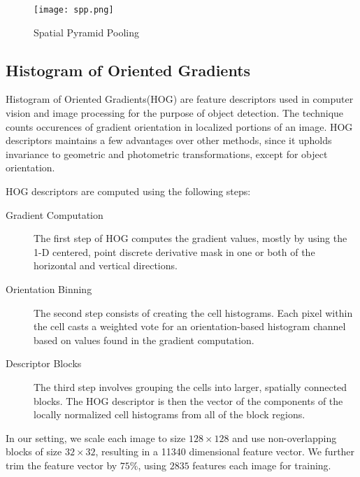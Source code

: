 \begin{figure}[H]
\centering
\texttt{[image: spp.png]}
\label{fig:spp}
\caption{Spatial Pyramid Pooling}
\end{figure}

\subsection{Histogram of Oriented Gradients}
Histogram of Oriented Gradients(HOG) are feature descriptors used in computer vision and image processing for the purpose of object detection. The technique counts occurences of gradient orientation in localized portions of an image. HOG descriptors maintains a few advantages over other methods, since it upholds invariance to geometric and photometric transformations, except for object orientation.\par
HOG descriptors are computed using the following steps:
\begin{description}
\item[Gradient Computation] The first step of HOG computes the gradient values, mostly by using the 1-D centered, point discrete derivative mask in one or both of the horizontal and vertical directions.
\item[Orientation Binning] The second step consists of creating the cell histograms. Each pixel within the cell casts a weighted vote for an orientation-based histogram channel based on values found in the gradient computation.
\item[Descriptor Blocks] The third step involves grouping the cells into larger, spatially connected blocks. The HOG descriptor is then the vector of the components of the locally normalized cell histograms from all of the block regions.
\end{description}
In our setting, we scale each image to size $128 \times 128$ and use non-overlapping blocks of size $32 \times 32$, resulting in a 11340 dimensional feature vector. We further trim the feature vector by $75\%$, using $2835$ features each image for training.

